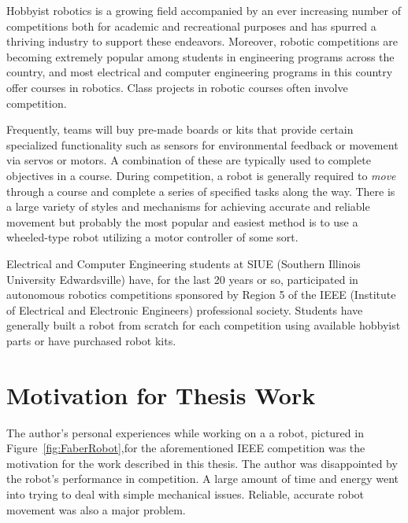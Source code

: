 \documentclass[12pt,oneside,final]{siuethesis}
\theoremstyle{definition}
\begin{document}
Hobbyist robotics is a growing field accompanied by an ever increasing number of competitions both for academic and recreational purposes and has spurred a thriving industry to support these endeavors.  Moreover, robotic competitions are becoming extremely popular among students in engineering programs across the country, and most electrical and computer engineering programs in this country offer courses in robotics.  Class projects in robotic courses often involve competition.

Frequently, teams will buy pre-made boards or kits that provide certain specialized functionality such as sensors for environmental feedback or movement via servos or motors. A combination of these are typically used to complete objectives in a course.  During competition, a robot is generally required to \emph{move} through a course and complete a series of specified tasks along the way. There is a large variety of styles and mechanisms for achieving accurate and reliable movement but probably the most popular and easiest method is to use a wheeled-type robot utilizing a motor controller of some sort.

Electrical and Computer Engineering students at SIUE (Southern Illinois University Edwardsville) have, for the last 20 years or so, participated in autonomous robotics competitions sponsored by Region 5 of the IEEE (Institute of Electrical and Electronic Engineers) professional society. Students have generally built a robot from scratch for each competition using available hobbyist parts or have purchased robot kits. 
 
\section{Motivation for Thesis Work} 

The author's personal experiences while working on a a robot, pictured in Figure~\ref{fig:FaberRobot},for the aforementioned IEEE competition was the motivation for the work described in this thesis.  The author was disappointed by the robot's performance in competition. A large amount of time and energy went into trying to deal with simple mechanical issues.  Reliable, accurate robot movement was also a major problem. 
\end{document}
